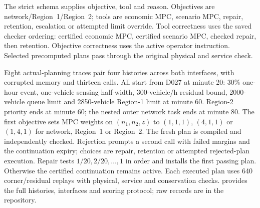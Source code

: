 The strict schema supplies objective, tool and reason. Objectives are
network/Region~1/Region~2; tools are economic MPC, scenario MPC, repair,
retention, escalation or attempted limit override. Tool correctness uses
the saved checker ordering: certified economic MPC, certified scenario
MPC, checked repair, then retention. Objective correctness uses the active
operator instruction. Selected precomputed plans pass through the original
physical and service check.

Eight actual-planning traces pair four histories across both interfaces,
with corrupted memory and thirteen calls. All start from D027 at minute
20: 30\% one-hour event, one-vehicle sensing half-width, 300-vehicle/h
residual bound, 2000-vehicle queue limit and 2850-vehicle Region-1 limit at
minute 60. Region-2 priority ends at minute 60; the nested outer network
task ends at minute 80. The first objective sets MPC weights on
$(n_1,n_2,z)$ to $(1,1,1)$, $(4,1,1)$ or $(1,4,1)$ for network, Region~1 or
Region~2. The fresh plan is compiled and independently checked. Rejection
prompts a second call with failed margins and the continuation expiry;
choices are repair, retention or attempted rejected-plan execution.
Repair tests $1/20,2/20,\ldots,1$ in order and installs the first passing
plan. Otherwise the certified continuation remains active. Each executed
plan uses 640 corner/residual replays with physical, service and
conservation checks.  provides the full
histories, interfaces and scoring protocol; raw records are in the
repository.

\FloatBarrier

